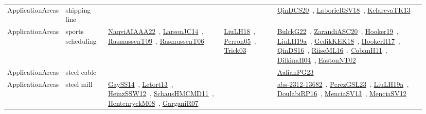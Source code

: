{\begin{longtable}{lp{3cm}>{\raggedright\arraybackslash}p{6cm}>{\raggedright\arraybackslash}p{6cm}>{\raggedright\arraybackslash}p{8cm}}
\index{shipping line}\index{ApplicationAreas!shipping line}ApplicationAreas & shipping line &  &  & \href{../works/QinDCS20.pdf}{QinDCS20}~\cite{QinDCS20}, \href{../works/LaborieRSV18.pdf}{LaborieRSV18}~\cite{LaborieRSV18}, \href{../works/KelarevaTK13.pdf}{KelarevaTK13}~\cite{KelarevaTK13}\\
\index{sports scheduling}\index{ApplicationAreas!sports scheduling}ApplicationAreas & sports scheduling & \href{../works/NaqviAIAAA22.pdf}{NaqviAIAAA22}~\cite{NaqviAIAAA22}, \href{../works/LarsonJC14.pdf}{LarsonJC14}~\cite{LarsonJC14}, \href{../works/RasmussenT09.pdf}{RasmussenT09}~\cite{RasmussenT09}, \href{../works/RasmussenT06.pdf}{RasmussenT06}~\cite{RasmussenT06} & \href{../works/LiuLH18.pdf}{LiuLH18}~\cite{LiuLH18}, \href{../works/Perron05.pdf}{Perron05}~\cite{Perron05}, \href{../works/Trick03.pdf}{Trick03}~\cite{Trick03} & \href{../works/BulckG22.pdf}{BulckG22}~\cite{BulckG22}, \href{../works/ZarandiASC20.pdf}{ZarandiASC20}~\cite{ZarandiASC20}, \href{../works/Hooker19.pdf}{Hooker19}~\cite{Hooker19}, \href{../works/LiuLH19a.pdf}{LiuLH19a}~\cite{LiuLH19a}, \href{../works/GedikKEK18.pdf}{GedikKEK18}~\cite{GedikKEK18}, \href{../works/HookerH17.pdf}{HookerH17}~\cite{HookerH17}, \href{../works/QinDS16.pdf}{QinDS16}~\cite{QinDS16}, \href{../works/RiiseML16.pdf}{RiiseML16}~\cite{RiiseML16}, \href{../works/CobanH11.pdf}{CobanH11}~\cite{CobanH11}, \href{../works/DilkinaH04.pdf}{DilkinaH04}~\cite{DilkinaH04}, \href{../works/EastonNT02.pdf}{EastonNT02}~\cite{EastonNT02}\\
\index{steel cable}\index{ApplicationAreas!steel cable}ApplicationAreas & steel cable &  &  & \href{../works/AalianPG23.pdf}{AalianPG23}~\cite{AalianPG23}\\
\index{steel mill}\index{ApplicationAreas!steel mill}ApplicationAreas & steel mill & \href{../works/GaySS14.pdf}{GaySS14}~\cite{GaySS14}, \href{../works/Letort13.pdf}{Letort13}~\cite{Letort13}, \href{../works/HeinzSSW12.pdf}{HeinzSSW12}~\cite{HeinzSSW12}, \href{../works/SchausHMCMD11.pdf}{SchausHMCMD11}~\cite{SchausHMCMD11}, \href{../works/HentenryckM08.pdf}{HentenryckM08}~\cite{HentenryckM08}, \href{../works/GarganiR07.pdf}{GarganiR07}~\cite{GarganiR07} &  & \href{../works/abs-2312-13682.pdf}{abs-2312-13682}~\cite{abs-2312-13682}, \href{../works/PerezGSL23.pdf}{PerezGSL23}~\cite{PerezGSL23}, \href{../works/LiuLH19a.pdf}{LiuLH19a}~\cite{LiuLH19a}, \href{../works/DoulabiRP16.pdf}{DoulabiRP16}~\cite{DoulabiRP16}, \href{../works/MenciaSV13.pdf}{MenciaSV13}~\cite{MenciaSV13}, \href{../works/MenciaSV12.pdf}{MenciaSV12}~\cite{MenciaSV12}\\

\end{longtable}}
